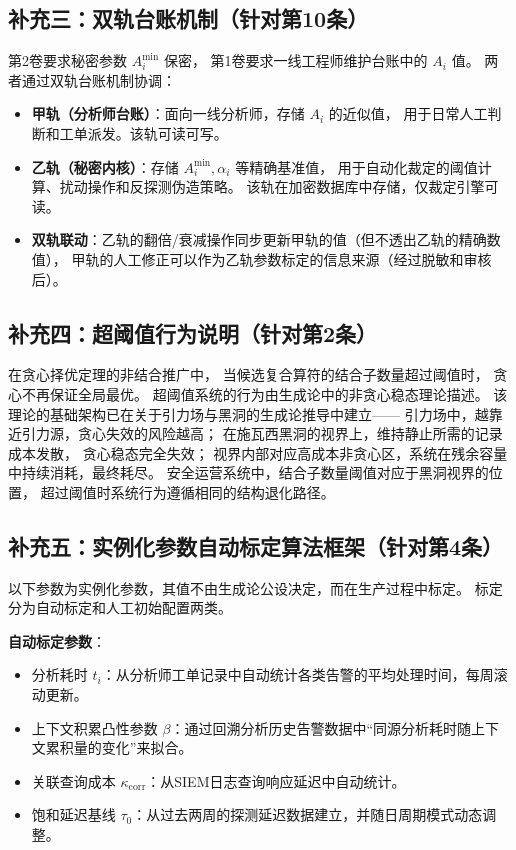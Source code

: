\documentclass[11pt,a4paper]{article}
\begin{document}
\subsection{补充三：双轨台账机制（针对第10条）}

第2卷要求秘密参数 $A_i^{\min}$ 保密，
第1卷要求一线工程师维护台账中的 $A_i$ 值。
两者通过双轨台账机制协调：

\begin{itemize}
    \item \textbf{甲轨（分析师台账）}：面向一线分析师，存储 $A_i$ 的近似值，
          用于日常人工判断和工单派发。该轨可读可写。
    \item \textbf{乙轨（秘密内核）}：存储 $A_i^{\min}, \alpha_i$ 等精确基准值，
          用于自动化裁定的阈值计算、扰动操作和反探测伪造策略。
          该轨在加密数据库中存储，仅裁定引擎可读。
    \item \textbf{双轨联动}：乙轨的翻倍/衰减操作同步更新甲轨的值（但不透出乙轨的精确数值），
          甲轨的人工修正可以作为乙轨参数标定的信息来源（经过脱敏和审核后）。
\end{itemize}

\subsection{补充四：超阈值行为说明（针对第2条）}

在贪心择优定理的非结合推广中，
当候选复合算符的结合子数量超过阈值时，
贪心不再保证全局最优。
超阈值系统的行为由生成论中的非贪心稳态理论描述。
该理论的基础架构已在关于引力场与黑洞的生成论推导中建立——
引力场中，越靠近引力源，贪心失效的风险越高；
在施瓦西黑洞的视界上，维持静止所需的记录成本发散，
贪心稳态完全失效；
视界内部对应高成本非贪心区，系统在残余容量中持续消耗，最终耗尽。
安全运营系统中，结合子数量阈值对应于黑洞视界的位置，
超过阈值时系统行为遵循相同的结构退化路径。

\subsection{补充五：实例化参数自动标定算法框架（针对第4条）}

以下参数为实例化参数，其值不由生成论公设决定，而在生产过程中标定。
标定分为自动标定和人工初始配置两类。

\textbf{自动标定参数}：
\begin{itemize}
    \item 分析耗时 $t_i$：从分析师工单记录中自动统计各类告警的平均处理时间，每周滚动更新。
    \item 上下文积累凸性参数 $\beta$：通过回溯分析历史告警数据中“同源分析耗时随上下文累积量的变化”来拟合。
    \item 关联查询成本 $\kappa_{\text{corr}}$：从SIEM日志查询响应延迟中自动统计。
    \item 饱和延迟基线 $\tau_0$：从过去两周的探测延迟数据建立，并随日周期模式动态调整。
\end{itemize}
\end{document}
